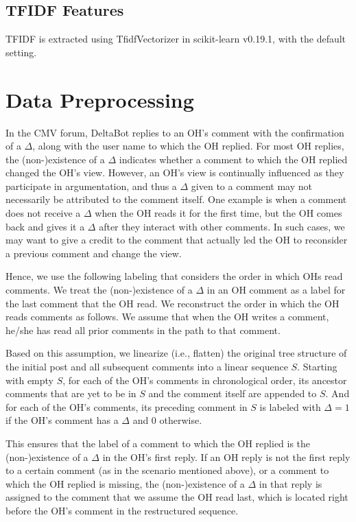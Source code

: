 \documentclass[11pt,a4paper]{article}
\begin{document}
\subsection{TFIDF Features}
TFIDF is extracted using \textsf{TfidfVectorizer} in \textsf{scikit-learn v0.19.1}, with the default setting.



\section{Data Preprocessing\label{app:data}}
In the CMV forum, DeltaBot replies to an OH's comment with the confirmation of a $\Delta$, along with the user name to which the OH replied.
For most OH replies, the (non-)existence of a $\Delta$ indicates whether a comment to which the OH replied changed the OH's view. However, an OH's view is continually influenced as they participate in argumentation, and thus a $\Delta$ given to a comment may not necessarily be attributed to the comment itself. One example is when a comment does not receive a $\Delta$ when the OH reads it for the first time, but the OH comes back and gives it a $\Delta$ after they interact with other comments. In such cases, we may want to give a credit to the comment that actually led the OH to reconsider a previous comment and change the view.

Hence, we use the following labeling that considers the order in which OHs read comments. We treat the (non-)existence of a $\Delta$ in an OH comment as a label for the last comment that the OH read. We reconstruct the order in which the OH reads comments as follows. We assume that when the OH writes a comment, he/she has read all prior comments in the path to that comment. 

Based on this assumption, we linearize (i.e., flatten) the original tree structure of the initial post and all subsequent comments into a linear sequence $S$. Starting with empty $S$, for each of the OH's comments in chronological order, its ancestor comments that are yet to be in $S$ and the comment itself are appended to $S$. And for each of the OH's comments, its preceding comment in $S$ is labeled with $\Delta = 1$ if the OH's comment has a $\Delta$ and 0 otherwise.

This ensures that the label of a comment to which the OH replied is the (non-)existence of a $\Delta$ in the OH's first reply. If an OH reply is not the first reply to a certain comment (as in the scenario mentioned above), or a comment to which the OH replied is missing, the (non-)existence of a $\Delta$ in that reply is assigned to the comment that we assume the OH read last, which is located right before the OH's comment in the restructured sequence.
\end{document}
